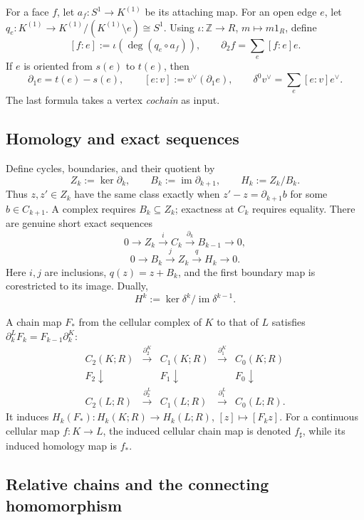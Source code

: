 For a face $f$, let $a_f:S^1\to K^{(1)}$ be its attaching map.
For an open edge $e$, let
$q_e:K^{(1)}\to K^{(1)}/(K^{(1)}\setminus e)\cong S^1$.
Using $\iota:\mathbb Z\to R$, $m\mapsto m1_R$, define
\[
 [f:e]:=\iota(\deg(q_e\circ a_f)),
 \qquad \partial_2f=\sum_e[f:e]e.
\]
If $e$ is oriented from $s(e)$ to $t(e)$, then
\[
 \partial_1e=t(e)-s(e),\qquad [e:v]:=v^\vee(\partial_1e),
 \qquad \delta^0v^\vee=\sum_e[e:v]e^\vee.
\]
The last formula takes a vertex \emph{cochain} as input.

\subsection*{Homology and exact sequences}

Define cycles, boundaries, and their quotient by
\[
 Z_k:=\ker\partial_k,\qquad B_k:=\operatorname{im}\partial_{k+1},
 \qquad H_k:=Z_k/B_k.
\]
Thus $z,z'\in Z_k$ have the same class exactly when
$z'-z=\partial_{k+1}b$ for some $b\in C_{k+1}$.
A complex requires $B_k\subseteq Z_k$; exactness at $C_k$ requires equality.
There are genuine short exact sequences
\[
 0\longrightarrow Z_k\xrightarrow{\ i\ }C_k
 \xrightarrow{\ \partial_k\ }B_{k-1}\longrightarrow0,
\]
\[
 0\longrightarrow B_k\xrightarrow{\ j\ }Z_k
 \xrightarrow{\ q\ }H_k\longrightarrow0.
\]
Here $i,j$ are inclusions, $q(z)=z+B_k$, and the first boundary map is
corestricted to its image. Dually,
\[
 H^k:=\ker\delta^k/\operatorname{im}\delta^{k-1}.
\]

A chain map $F_*$ from the cellular complex of $K$ to that of $L$
satisfies $\partial_k^L F_k=F_{k-1}\partial_k^K$:
\[
\begin{array}{ccccc}
 C_2(K;R)&\xrightarrow{\partial_2^K}&C_1(K;R)
 &\xrightarrow{\partial_1^K}&C_0(K;R)\\[3pt]
 {\scriptstyle F_2}\downarrow&&{\scriptstyle F_1}\downarrow
 &&{\scriptstyle F_0}\downarrow\\[3pt]
 C_2(L;R)&\xrightarrow{\partial_2^L}&C_1(L;R)
 &\xrightarrow{\partial_1^L}&C_0(L;R).
\end{array}
\]
It induces $H_k(F_*):H_k(K;R)\to H_k(L;R)$,
$[z]\mapsto[F_kz]$.
For a continuous cellular map $f:K\to L$, the induced cellular chain
map is denoted $f_\sharp$, while its induced homology map is $f_*$.

\subsection*{Relative chains and the connecting homomorphism}

